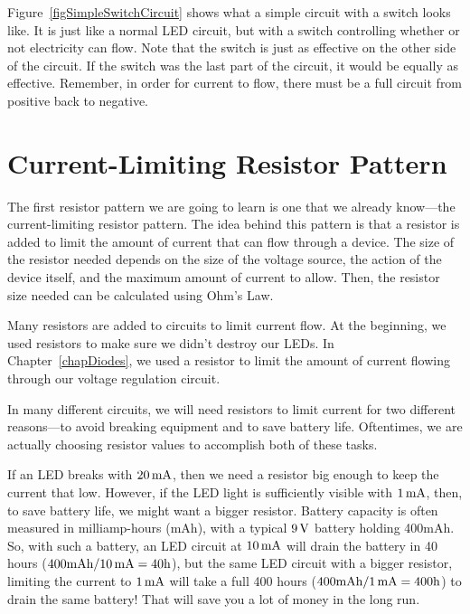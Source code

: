 
Figure~\ref{figSimpleSwitchCircuit} shows what a simple circuit with a switch looks like.
It is just like a normal LED circuit, but with a switch controlling whether or not electricity can flow.
Note that the switch is just as effective on the other side of the circuit.
If the switch was the last part of the circuit, it would be equally as effective.  
Remember, in order for current to flow, there must be a full circuit from positive back to negative.

\section{Current-Limiting Resistor Pattern}

The first resistor pattern we are going to learn is one that we already know---the current-limiting resistor pattern.
The idea behind this pattern is that a resistor is added to limit the amount of current that can flow through a device.
The size of the resistor needed depends on the size of the voltage source, the action of the device itself, and the maximum amount of current to allow.
Then, the resistor size needed can be calculated using Ohm's Law.

Many resistors are added to circuits to limit current flow.
At the beginning, we used resistors to make sure we didn't destroy our LEDs.
In Chapter~\ref{chapDiodes}, we used a resistor to limit the amount of current flowing through our voltage regulation circuit.

In many different circuits, we will need resistors to limit current for two different reasons---to avoid breaking equipment and to save battery life.
Oftentimes, we are actually choosing resistor values to accomplish both of these tasks.

If an LED breaks with $20\,\si{\milli\ampere}$, then we need a resistor big enough to keep the current that low.
However, if the LED light is sufficiently visible with $1\,\si{\milli\ampere}$, then, to save battery life, we might want a bigger resistor.
Battery capacity is often measured in milliamp-hours (mAh), with a typical $9\,\si{\volt}$ battery holding 400mAh.  
So, with such a battery, an LED circuit at $10\,\si{\milli\ampere}$ will drain the battery in 40 hours ($400\textrm{mAh} / 10\,\si{\milli\ampere} = 40\textrm{h}$), but the same LED circuit with a bigger resistor, limiting the current to $1\,\si{\milli\ampere}$ will take a full 400 hours ($400\textrm{mAh} / 1\,\si{\milli\ampere} = 400\textrm{h}$) to drain the same battery!
That will save you a lot of money in the long run.

